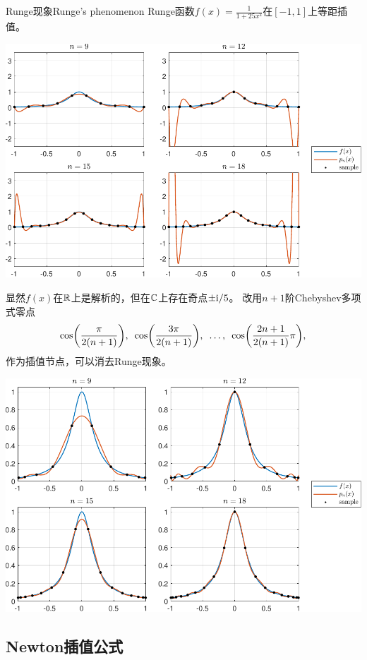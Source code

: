 \begin{example}
    {Runge现象}{Runge's phenomenon}
    Runge函数$f(x)=\frac1{1+25x^2}$在$[-1,1]$上等距插值。
    \begin{center}
        \includegraphics[width=0.9\linewidth]{figures/Runge.pdf}
    \end{center}
    显然$f(x)$在$\mathbb R$上是解析的，但在$\mathbb C$上存在奇点$\pm\mathrm{i}/5$。
    \tcblower
    改用$n+1$阶Chebyshev多项式零点
    \[
        \cos\biggl(\frac{\pi}{2(n+1)}\biggr),\enspace
        \cos\biggl(\frac{3\pi}{2(n+1)}\biggr),\enspace
        \ldots,\enspace
        \cos\biggl(\frac{2n+1}{2(n+1)}\pi\biggr),
    \]
    作为插值节点，可以消去Runge现象。
    \begin{center}
        \includegraphics[width=0.9\linewidth]{figures/Rungeless.pdf}
    \end{center}
\end{example}

\subsection{Newton插值公式}

